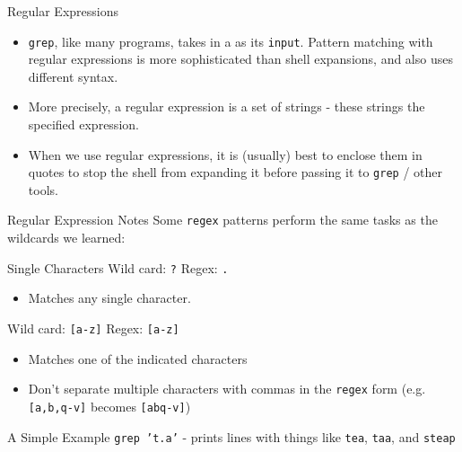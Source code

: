 \begin{frame}[fragile]{Regular Expressions}
  \begin{itemize}[<+- | alert@+>]
    \item \texttt{grep}, like many programs, takes in a  as its \texttt{input}.
          Pattern matching with regular expressions is more sophisticated than shell expansions, and also uses
          different syntax.
    \item More precisely, a regular expression is a set of strings \-- these strings  the specified
          expression.
    \item When we use regular expressions, it is (usually) best to enclose them in quotes to stop the shell from
          expanding it before passing it to \texttt{grep} / other tools.
  \end{itemize}
\end{frame}

\begin{frame}[fragile]{Regular Expression Notes}
  Some \texttt{regex} patterns perform the same tasks as the wildcards we learned:
  \begin{block}{Single Characters}
    Wild card: \texttt{?} \hspace*{2ex} Regex: \texttt{.}
    \begin{itemize}
      \item Matches any single character.
    \end{itemize}
    Wild card: \texttt{[a-z]} \hspace*{2ex} Regex: \texttt{[a-z]}
    \begin{itemize}
      \item Matches one of the indicated characters
      \item Don't separate multiple characters with commas in the \texttt{regex} form (e.g. \texttt{[a,b,q-v]}
            becomes \texttt{[abq-v]})
    \end{itemize}
  \end{block}
  \begin{block}{A Simple Example}
    \texttt{grep 't.a'} \-- prints lines with things like \texttt{tea}, \texttt{taa}, and \texttt{steap}
  \end{block}
\end{frame}

